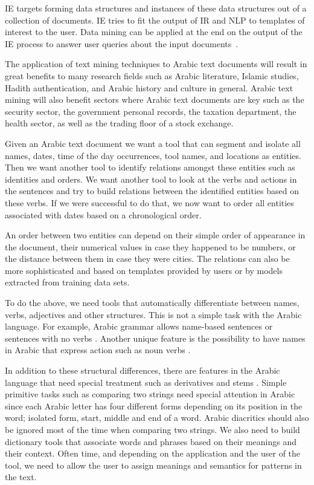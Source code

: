 \documentclass[12pt]{article}
\newcommand{\noTrNoVocRL}[1]{\novocalize\transfalse\RL{#1}\transtrue\vocalize}
\begin{document}
{IE targets forming data structures and instances of these 
data structures out of a collection of documents.
IE tries to fit the output of IR and NLP to templates of 
interest to the user.
Data mining can be applied at the end on the output of the 
IE process to answer user queries about the input 
documents~\cite{JHa05}.


The application of text mining techniques to Arabic text documents 
will result in great benefits to many research fields such as 
Arabic literature,
Islamic studies, Hadith authentication, and Arabic history and 
culture in general.
Arabic text mining will also benefit sectors where Arabic text 
documents are key such as the security sector,
the government personal records,
the taxation department,
the health sector,
as well as the trading floor of a stock exchange.
 
Given an Arabic text document we want a tool that can segment 
and isolate all names, dates, time of the day occurrences,
tool names, and locations as entities.
Then we want another tool to identify relations amongst 
these entities such as identities and orders.
We want another tool to look at the verbs and actions in 
the sentences and try to build relations between the identified 
entities based on these verbs.
If we were successful to do that,
we now want to order all entities associated with dates based 
on a chronological order.

An order between two entities can depend on 
their simple order of appearance in the document, their 
numerical values in case they happened to be numbers, or
the distance between them in case they were cities. 
The relations can also be more sophisticated and 
based on templates provided by users or by 
models extracted from training data sets. 

To do the above, 
we need tools that automatically differentiate between 
names, verbs, adjectives and other structures.
This is not a simple task with the Arabic language.
For example, Arabic grammar allows name-based sentences 
or sentences with no verbs \noTrNoVocRL{^gml ismiyT} .
Another unique feature is the possibility to have names in Arabic 
that express action such as noun verbs 
\noTrNoVocRL{ism f`l, f-a`l $\ldots$}.

In addition to these structural differences,
there are features in the Arabic language that need special 
treatment such as derivatives and stems 
\noTrNoVocRL{alm^staq-at w al^g_dwr}.
Simple primitive tasks such as comparing two strings need 
special attention in Arabic since each Arabic letter has 
four different forms depending on its position in the word; 
isolated form, start, middle and end of a word.
Arabic diacritics should also be ignored most of the time 
when comparing two strings.
We also need to build dictionary tools that associate words 
and phrases based on their meanings and their context.
Often time,
and depending on the application and the user of the tool,
we need to allow the user to assign meanings and semantics 
for patterns in the text.

}
\end{document}
